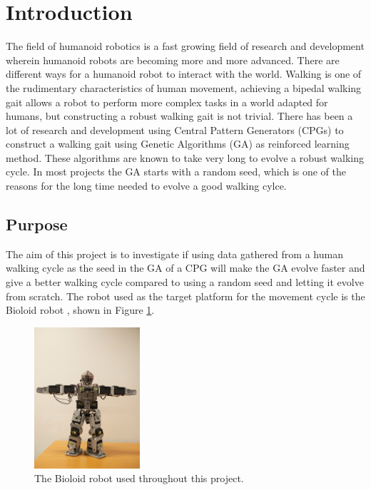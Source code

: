 \section{Introduction}
The field of humanoid robotics is a fast growing field of research and development wherein humanoid robots are becoming more and more advanced. There are different ways for a humanoid robot to interact with the world. Walking is one of the rudimentary characteristics of human movement, achieving a bipedal walking gait allows a robot to perform more complex tasks in a world adapted for humans, but constructing a robust walking gait is not trivial. There has been a lot of research and development using Central Pattern Generators (CPGs) to construct a walking gait using Genetic Algorithms (GA) as reinforced learning method. These algorithms are known to take very long to evolve a robust walking cycle. In most projects the GA starts with a random seed, which is one of the reasons for the long time needed to evolve a good walking cylce. 


\subsection{Purpose}
The aim of this project is to investigate if using data gathered from a human walking cycle as the seed in the GA of a CPG will make the GA evolve faster and give a better walking cycle compared to using a random seed and letting it evolve from scratch. The robot used as the target platform for the movement cycle is the Bioloid robot \cite{bioloid}, shown in Figure \ref{fig:bioloid}.

\begin{figure}[htbp]
    \centering
    \includegraphics[width=0.35\textwidth]{include/figure/robot.jpg}
    \caption{The Bioloid robot used throughout this project.}
    \label{fig:bioloid}
\end{figure}